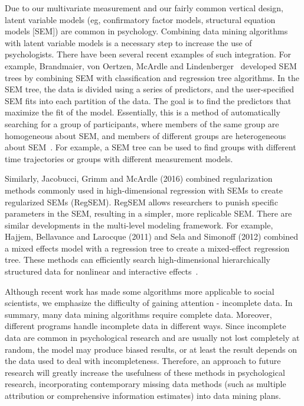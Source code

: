 Due to our multivariate measurement and our fairly common vertical
 design, latent variable models (eg, confirmatory factor models, 
structural equation models [SEM]) are common in psychology. 
Combining data mining algorithms with latent variable models is a 
necessary step to increase the use of psychologists. There have 
been several recent examples of such integration. For example, 
Brandmaier, von Oertzen, McArdle and Lindenberger~\cite{editor11} developed 
SEM trees by combining SEM with classification and regression 
tree algorithms. In the SEM tree, the data is divided using a 
series of predictors, and the user-specified SEM fits into each 
partition of the data. The goal is to find the predictors that 
maximize the fit of the model. Essentially, this is a method of 
automatically searching for a group of participants, where members
 of the same group are homogeneous about SEM, and members of 
different groups are heterogeneous about SEM~\cite{editor11}. 
For example, a SEM tree can be used to
 find groups with different time trajectories or groups with 
different measurement models.

Similarly, Jacobucci, Grimm and McArdle (2016) combined 
regularization methods commonly used in high-dimensional regression
 with SEMs to create regularized SEMs (RegSEM). RegSEM allows 
researchers to punish specific parameters in the SEM, resulting in
 a simpler, more replicable SEM. There are similar developments in
 the multi-level modeling framework. For example, Hajjem, 
Bellavance and Larocque (2011) and Sela and Simonoff (2012) combined
 a mixed effects model with a regression tree to create a 
mixed-effect regression tree. These methods can efficiently search
 high-dimensional hierarchically structured data for nonlinear and
 interactive effects~\cite{editor11}.

Although recent work has made some algorithms more applicable to 
social scientists, we emphasize the difficulty of gaining 
attention - incomplete data. In summary, many data mining 
algorithms require complete data. Moreover, different programs 
handle incomplete data in different ways. Since incomplete data are
 common in psychological research and are usually not lost 
completely at random, the model may produce biased results, or at 
least the result depends on the data used to deal with 
incompleteness. Therefore, an approach to future research will 
greatly increase the usefulness of these methods in psychological 
research, incorporating contemporary missing data methods (such as
 multiple attribution or comprehensive information estimates) into
 data mining plans.


